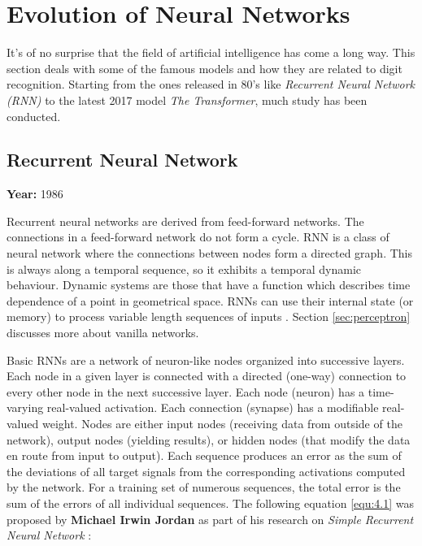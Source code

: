 \documentclass[12pt, a4paper]{report}
\begin{document}
\chapter{Evolution of Neural Networks}
\label{chap:evolution}
\thispagestyle{fancy}

\hspace{0.5cm} It's of no surprise that the field of artificial intelligence has come a long way. This section deals with some of the famous models and how they are related to digit recognition. Starting from the ones released in 80's like \emph{Recurrent Neural Network (RNN)} to the latest 2017 model \emph{The Transformer}, much study has been conducted.

\section{Recurrent Neural Network}
\label{sec:RNN}

\textbf{Year:} 1986

Recurrent neural networks are derived from feed-forward networks. The connections in a feed-forward network do not form a cycle. RNN is a class of neural network where the connections between nodes form a directed graph. This is always along a temporal sequence, so it exhibits a temporal dynamic behaviour. Dynamic systems are those that have a function which describes time dependence of a point in geometrical space. RNNs can use their internal state (or memory) to process variable length sequences of inputs \cite{wiki:rnns}. Section \eqref{sec:perceptron} discusses more about vanilla networks.

Basic RNNs are a network of neuron-like nodes organized into successive layers. Each node in a given layer is connected with a directed (one-way) connection to every other node in the next successive layer. Each node (neuron) has a time-varying real-valued activation. Each connection (synapse) has a modifiable real-valued weight. Nodes are either input nodes (receiving data from outside of the network), output nodes (yielding results), or hidden nodes (that modify the data en route from input to output). Each sequence produces an error as the sum of the deviations of all target signals from the corresponding activations computed by the network. For a training set of numerous sequences, the total error is the sum of the errors of all individual sequences. The following equation \eqref{equ:4.1} was proposed by \textbf{Michael Irwin Jordan} as part of his research on \emph{Simple Recurrent Neural Network} \cite{wiki:rnns}:
\end{document}
